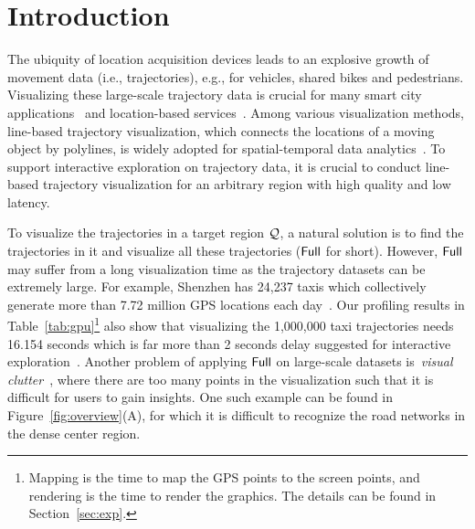 \section{Introduction}\label{sec:intro}
The ubiquity of location acquisition devices leads to an explosive growth of movement data (i.e., trajectories), e.g., for vehicles, shared bikes and pedestrians. Visualizing these large-scale trajectory data is crucial for many smart city applications~\cite{wang2014visual, tang2017efficient, zheng2011learning} and location-based services~\cite{liu2016smartadp, zheng2010collaborative}. Among various visualization methods, line-based trajectory visualization, which connects the locations of a moving object by polylines, is widely adopted for spatial-temporal data analytics~\cite{chen2015survey, visualanalysis, bigchanvis}. To support interactive exploration on trajectory data, it is crucial to conduct line-based trajectory visualization for an arbitrary region with high quality and low latency.

 To visualize the trajectories in a target region $\mathcal{Q}$, a natural solution is to find the trajectories in it and visualize all these trajectories ($\mathsf{Full}$ for short). However, $\mathsf{Full}$ may suffer from a long visualization time as the trajectory datasets can be extremely large. For example, Shenzhen has 24,237 taxis which collectively generate more than 7.72 million GPS locations each day~\cite{sz}. Our profiling results in Table~\ref{tab:gpu}\footnote{Mapping is the time to map the GPS points to the screen points, and rendering is the time to render the graphics. The details can be found in Section~\ref{sec:exp}.} also show that visualizing the 1,000,000 taxi trajectories needs 16.154 seconds which is far more than 2 seconds delay suggested for interactive exploration~\cite{shneiderman1984response}.
Another problem of applying $\mathsf{Full}$ on large-scale datasets is~\textit{visual clutter}~\cite{kwon2017sampling}, where there are too many points in the visualization such that it is difficult for users to gain insights. One such example can be found in Figure~\ref{fig:overview}(A), for which it is difficult to recognize the road networks in the dense center region.   



